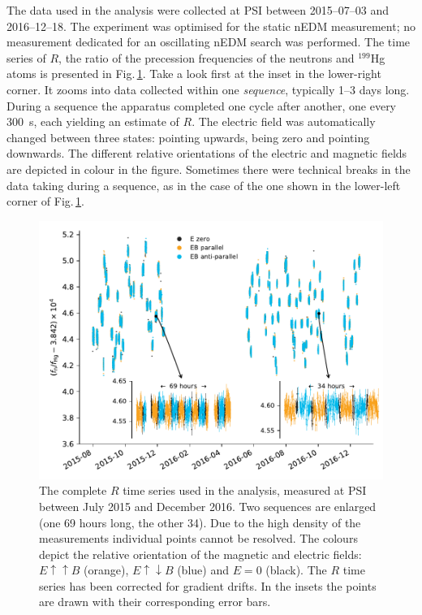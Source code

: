The data used in the analysis were collected at PSI between 2015--07--03 and 2016--12--18.
The experiment was optimised for the static nEDM measurement; no measurement dedicated for an oscillating nEDM search was performed. The time series of $R$, the ratio of the precession frequencies of the neutrons and ${}^{199}$Hg atoms is presented in Fig.\,\ref{fig:PSI_dataset_time_domain}.
Take a look first at the inset in the lower-right corner. It zooms into data collected within one \emph{sequence}, typically 1--3 days long.
During a sequence the apparatus completed one cycle after another, one every \SI{300}{\second}, each yielding an estimate of $R$.
The electric field was automatically changed between three states: pointing upwards, being zero and pointing downwards. The different relative orientations of the electric and magnetic fields are depicted in colour in the figure. Sometimes there were technical breaks in the data taking during a sequence, as in the case of the one shown in the lower-left corner of Fig.\,\ref{fig:PSI_dataset_time_domain}.

\begin{figure}
  \centering
  \includegraphics[width=\linewidth]{gfx/axions/deltah4mm_time_domain_inset_no_yerr.pdf}
  \caption{The complete $R$ time series used in the analysis, measured at PSI between July 2015 and December 2016. Two sequences are enlarged (one 69 hours long, the other 34). Due to the high density of the measurements individual points cannot be resolved. The colours depict the relative orientation of the magnetic and electric fields: $E \uparrow \uparrow B$ (orange), $E \uparrow \downarrow B$ (blue) and $E=0$ (black). The $R$ time series has been corrected for gradient drifts. In the insets the points are drawn with their corresponding error bars.}\label{fig:PSI_dataset_time_domain}
\end{figure}

